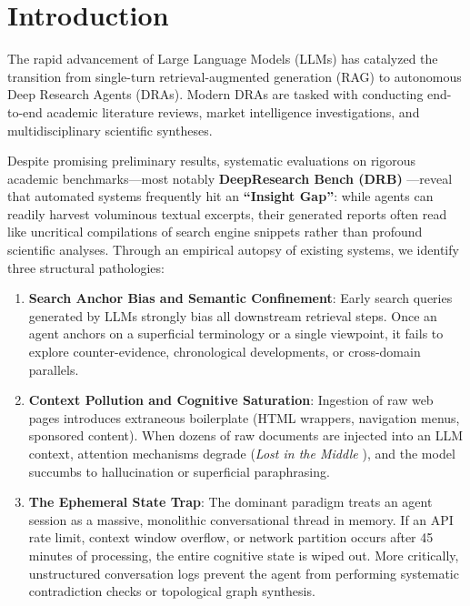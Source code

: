 \documentclass[11pt,a4paper]{article}
\begin{document}
\section{Introduction}

The rapid advancement of Large Language Models (LLMs) has catalyzed the transition from single-turn retrieval-augmented generation (RAG) to autonomous Deep Research Agents (DRAs). Modern DRAs are tasked with conducting end-to-end academic literature reviews, market intelligence investigations, and multidisciplinary scientific syntheses.

Despite promising preliminary results, systematic evaluations on rigorous academic benchmarks—most notably \textbf{DeepResearch Bench (DRB)} \cite{deepresearchbench2025,deepresearchbench22026}—reveal that automated systems frequently hit an \textbf{``Insight Gap''}: while agents can readily harvest voluminous textual excerpts, their generated reports often read like uncritical compilations of search engine snippets rather than profound scientific analyses. Through an empirical autopsy of existing systems, we identify three structural pathologies:

\begin{enumerate}
    \item \textbf{Search Anchor Bias and Semantic Confinement}: Early search queries generated by LLMs strongly bias all downstream retrieval steps. Once an agent anchors on a superficial terminology or a single viewpoint, it fails to explore counter-evidence, chronological developments, or cross-domain parallels.
    \item \textbf{Context Pollution and Cognitive Saturation}: Ingestion of raw web pages introduces extraneous boilerplate (HTML wrappers, navigation menus, sponsored content). When dozens of raw documents are injected into an LLM context, attention mechanisms degrade (\textit{Lost in the Middle} \cite{liu2024lost}), and the model succumbs to hallucination or superficial paraphrasing.
    \item \textbf{The Ephemeral State Trap}: The dominant paradigm treats an agent session as a massive, monolithic conversational thread in memory. If an API rate limit, context window overflow, or network partition occurs after 45 minutes of processing, the entire cognitive state is wiped out. More critically, unstructured conversation logs prevent the agent from performing systematic contradiction checks or topological graph synthesis.
\end{enumerate}
\end{document}

